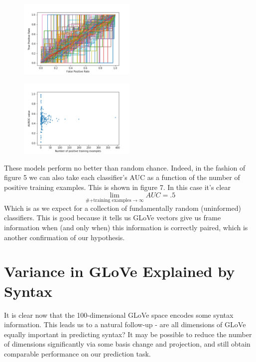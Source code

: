 \documentclass[a4paper]{article}
\begin{document}
\begin{figure}
	\centering
	\includegraphics[width=0.5\textwidth]{auc_plot5rand.png}
	\caption{\label{fig:frog} }
\end{figure}

\begin{figure}
	\centering
	\includegraphics[width=0.5\textwidth]{auc_scatter5rand.png}
	\caption{\label{fig:frog} }
\end{figure}

These models perform no better than random chance. Indeed, in the fashion of figure 5 we can also take each classifier's AUC as a function of the number of positive training examples. This is shown in figure 7. In this case it's clear
\[  \lim_{\# \text{+training examples} \rightarrow \infty} AUC = .5 \]
Which is as we expect for a collection of fundamentally random (uninformed) classifiers. This is good because it tells us GLoVe vectors give us frame information when (and only when) this information is correctly paired, which is another confirmation of our hypothesis.

\section{Variance in GLoVe Explained by Syntax}

It is clear now that the 100-dimensional GLoVe space encodes some syntax information. This leads us to a natural follow-up - are all dimensions of GLoVe equally important in predicting syntax? It may be possible to reduce the number of dimensions significantly via some basis change and projection, and still obtain comparable performance on our prediction task.
\end{document}
